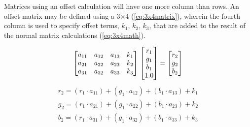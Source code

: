 Matrices using an offset calculation will have one more column than rows. An offset matrix may be defined using a 3$\times$4  (\ref{eq:3x4matrix}), wherein the fourth column is used to specify offset terms, $k_1$, $k_2$, $k_3$, that are added to the result of the normal matrix calculations (\ref{eq:3x4math}). 

\begin{equation} \label{eq:3x4matrix}
    \begin{bmatrix*}
        a_{11} & a_{12} & a_{13} & k_1\\
        a_{21} & a_{22} & a_{23} & k_2\\
        a_{31} & a_{32} & a_{33} & k_3\\
    \end{bmatrix*} \\
    \begin{bmatrix}
        r_1\\
        g_1\\
        b_1\\
        1.0
    \end{bmatrix}
    =
    \begin{bmatrix}
        r_2\\
        g_2\\
        b_2
    \end{bmatrix}
\end{equation}
\begin{equation} \label{eq:3x4math}
    \begin{aligned}
	r_2 = (r_1 \cdot a_{11}) + (g_1 \cdot a_{12}) + (b_1 \cdot a_{13}) + k_1\\
	g_2 = (r_1 \cdot a_{21}) + (g_1 \cdot a_{22}) + (b_1 \cdot a_{23}) + k_2\\
	b_2 = (r_1 \cdot a_{31}) + (g_1 \cdot a_{32}) + (b_1 \cdot a_{33}) + k_3
    \end{aligned}    
\end{equation}

